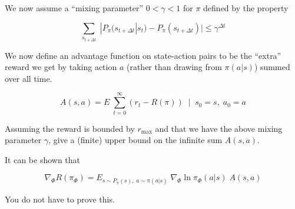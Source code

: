 We now assume a ``mixing parameter'' $0 < \gamma < 1$ for $\pi$ defined by the property

$$\sum_{s_{t + \Delta t}}\;|P_\pi(s_{t+\Delta t}|s_t) - P_\pi(s_{t+\Delta t})| \leq \gamma^{\Delta t}$$

We now define an advantage function on state-action pairs to be the ``extra'' reward we get by taking action $a$ (rather than drawing from $\pi(a|s)$) summed over all time.

$$A(s,a) = E\;\sum_{t=0}^\infty (r_t - R(\pi)) \;\;|\;\;s_0 = s,\;a_0 = a$$

Assuming the reward is bounded by $r_\mathrm{max}$ and that we have the above mixing parameter $\gamma$, give a (finite) upper bound on the infinite sum $A(s,a)$.


It can be shown that

$$\nabla_\Phi R(\pi_\Phi) = E_{s \sim P_\pi(s),\;a\sim \pi(a|s)}\;\nabla_\Phi \ln \pi_\Phi(a|s) \;A(s,a)$$

You do not have to prove this.




